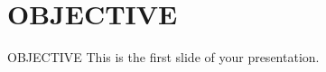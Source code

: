 \section{OBJECTIVE}
\begin{frame}{OBJECTIVE}
  This is the first slide of your presentation.
\end{frame}
